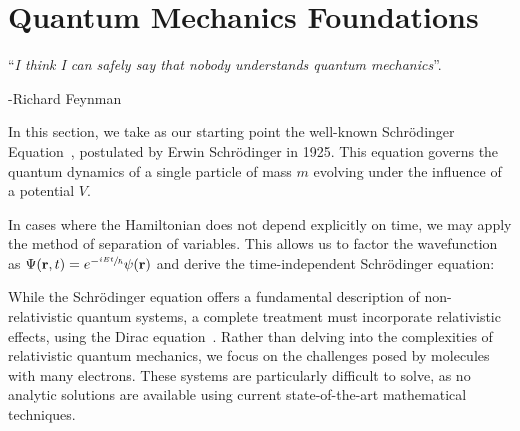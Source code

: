 \section{Quantum Mechanics Foundations}

\vspace{0.5cm}%
\begin{flushright}
  {\small
  ``{\em I think I can safely say that nobody
         understands quantum mechanics}''.

  -Richard Feynman
  }
\end{flushright}

\vspace{0.4cm}%
\noindent In this section, we take as our starting point the well-known
Schrödinger Equation~\cite{Schrdinger1926}, postulated by Erwin Schrödinger in
1925. This equation governs the quantum dynamics of a single particle of mass
$m$ evolving under the influence of a potential $V$.

\vspace{0.3cm}%
\vspace{0.3cm}%

In cases where the Hamiltonian does not depend explicitly on time, 
we may apply the method of separation of
variables. This allows us to factor the wavefunction as
$\Psi(\mathbf{r},t) = e^{-\sfrac{iEt}\hbar} \psi(\mathbf{r})$ and
derive the time-independent Schrödinger equation:

\vspace{0.3cm}%

\vspace{0.3cm}%
While the Schrödinger equation offers a fundamental description of
non-relativistic quantum systems, a complete treatment must incorporate
relativistic effects, using the Dirac equation~\cite{Dirac1928}.
Rather than delving into the complexities of relativistic quantum mechanics, we
focus on the challenges posed by molecules with many electrons. These systems
are particularly difficult to solve, as no analytic solutions are available
using current state-of-the-art mathematical techniques.

